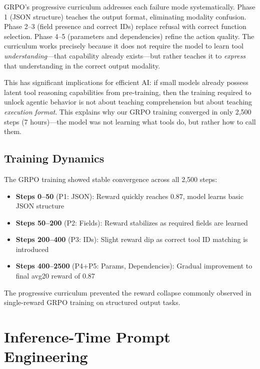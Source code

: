 \documentclass[10pt,twocolumn]{article}
\begin{document}
GRPO's progressive curriculum addresses each failure mode systematically. Phase 1 (JSON structure) teaches the output format, eliminating modality confusion. Phase 2--3 (field presence and correct IDs) replace refusal with correct function selection. Phase 4--5 (parameters and dependencies) refine the action quality. The curriculum works precisely because it does not require the model to learn tool \textit{understanding}---that capability already exists---but rather teaches it to \textit{express} that understanding in the correct output modality.

This has significant implications for efficient AI: if small models already possess latent tool reasoning capabilities from pre-training, then the training required to unlock agentic behavior is not about teaching comprehension but about teaching \textit{execution format}. This explains why our GRPO training converged in only 2,500 steps (7 hours)---the model was not learning what tools do, but rather how to call them.

\subsection{Training Dynamics}

The GRPO training showed stable convergence across all 2,500 steps:

\begin{itemize}[itemsep=1pt]
    \item \textbf{Steps 0--50} (P1: JSON): Reward quickly reaches 0.87, model learns basic JSON structure
    \item \textbf{Steps 50--200} (P2: Fields): Reward stabilizes as required fields are learned
    \item \textbf{Steps 200--400} (P3: IDs): Slight reward dip as correct tool ID matching is introduced
    \item \textbf{Steps 400--2500} (P4+P5: Params, Dependencies): Gradual improvement to final avg20 reward of 0.87
\end{itemize}

The progressive curriculum prevented the reward collapse commonly observed in single-reward GRPO training on structured output tasks.

\section{Inference-Time Prompt Engineering}
\end{document}
